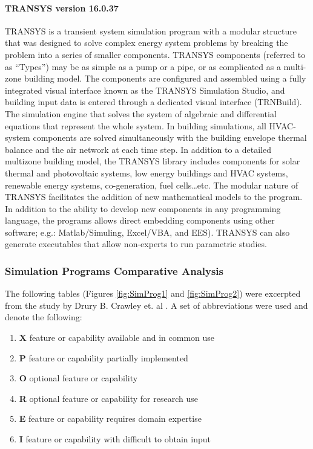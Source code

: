 \paragraph{TRANSYS version 16.0.37} TRANSYS is a transient system simulation program with a modular structure that was designed to solve complex energy system problems by breaking the problem into a series of smaller components. TRANSYS components (referred to as ``Types'') may be as simple as a pump or a pipe, or as complicated as a multi-zone building model. The components are configured and assembled using a fully integrated visual interface known as the TRANSYS Simulation Studio, and building input data is entered through a dedicated visual interface (TRNBuild). The simulation engine that solves the system of algebraic and differential equations that represent the whole system. In building simulations, all HVAC-system components are solved simultaneously with the building envelope thermal balance and the air network at each time step. In addition to a detailed multizone building model, the TRANSYS library includes components for solar thermal and photovoltaic systems, low energy buildings and HVAC systems, renewable energy systems, co-generation, fuel cells\ldots etc. The modular nature of TRANSYS facilitates the addition of new mathematical models to the program. In addition to the ability to develop new components in any programming language, the programs allows direct embedding components using other software; e.g.: Matlab/Simuling, Excel/VBA, and EES). TRANSYS can also generate executables that allow non-experts to run parametric studies. \label{par:TRANSYS}

\subsubsection{Simulation Programs Comparative Analysis}

The following tables (Figures \ref{fig:SimProg1} and \ref{fig:SimProg2}) were excerpted from the study by Drury B. Crawley et. al \cite{crawley05}. A set of abbreviations were used and denote the following:

\begin{enumerate}
\item \textbf{X} feature or capability available and in common use
\item \textbf{P} feature or capability partially implemented
\item \textbf{O} optional feature or capability
\item \textbf{R} optional feature or capability for research use
\item \textbf{E} feature or capability requires domain expertise
\item \textbf{I} feature or capability with difficult to obtain input
\end{enumerate}

